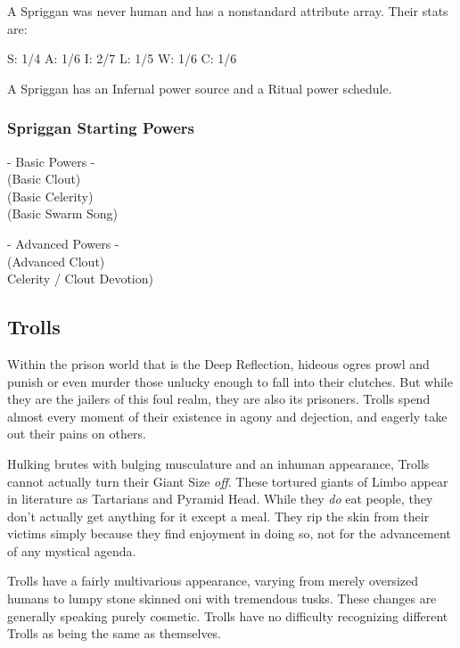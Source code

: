 A Spriggan was never human and has a nonstandard attribute array. Their stats are:

S: 1/4 A: 1/6 I: 2/7 L: 1/5 W: 1/6 C: 1/6

A Spriggan has an Infernal power source and a Ritual power schedule.

\subsubsection{Spriggan Starting Powers}

\hspace{\parindent} - Basic Powers -\\
 (Basic Clout)\\
 (Basic Celerity)\\
 (Basic Swarm Song)

- Advanced Powers -\\
 (Advanced Clout)\\
 Celerity / Clout Devotion) 

\subsection{Trolls} 

Within the prison world that is the Deep Reflection, hideous ogres prowl and punish or even murder those unlucky enough to fall into their clutches. But while they are the jailers of this foul realm, they are also its prisoners. Trolls spend almost every moment of their existence in agony and dejection, and eagerly take out their pains on others.

Hulking brutes with bulging musculature and an inhuman appearance, Trolls cannot actually turn their Giant Size \textit{off}. These tortured giants of Limbo appear in literature as Tartarians and Pyramid Head. While they \textit{do} eat people, they don't actually get anything for it except a meal. They rip the skin from their victims simply because they find enjoyment in doing so, not for the advancement of any mystical agenda.

Trolls have a fairly multivarious appearance, varying from merely oversized humans to lumpy stone skinned oni with tremendous tusks. These changes are generally speaking purely cosmetic. Trolls have no difficulty recognizing different Trolls as being the same as themselves.

